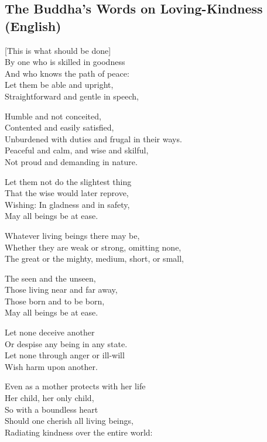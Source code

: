 \subsection{The Buddha's Words on Loving-Kindness (English)}


\begin{leader}
\end{leader}


[This is what should be done]\\
By one who is skilled in goodness\\
And who knows the path of peace:\\
Let them be able and upright,\\
Straightforward and gentle in speech,

Humble and not conceited,\\
Contented and easily satisfied,\\
Unburdened with duties and frugal in their ways.\\
Peaceful and calm, and wise and skilful,\\
Not proud and demanding in nature.

\enlargethispage{\baselineskip}

Let them not do the slightest thing\\
That the wise would later reprove,\\
Wishing: In gladness and in safety,\\
May all beings be at ease.

Whatever living beings there may be,\\
Whether they are weak or strong, omitting none,\\
The great or the mighty, medium, short, or small,

The seen and the unseen,\\
Those living near and far away,\\
Those born and to be born,\\
May all beings be at ease.

Let none deceive another\\
Or despise any being in any state.\\
Let none through anger or ill-will\\
Wish harm upon another.

Even as a mother protects with her life\\
Her child, her only child,\\
So with a boundless heart\\
Should one cherish all living beings,\\
Radiating kindness over the entire world:

